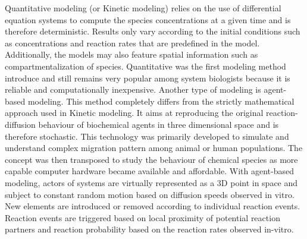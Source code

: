 Quantitative modeling (or Kinetic modeling) relies on the use of differential equation systems to compute the species concentrations at a given time and is therefore deterministic.
Results only vary according to the initial conditions such as concentrations and reaction rates that are predefined in the model.
Additionally, the models may also feature spatial information such as compartmentalization of species.
Quantitative was the first modeling method introduce and still remains very popular among system biologists because it is reliable and computationally inexpensive.
Another type of modeling is agent-based modeling.
This method completely differs from the strictly mathematical approach used in Kinetic modeling.
It aims at reproducing the original reaction-diffusion behaviour of biochemical agents in three dimensional space and is therefore stochastic.
This technology was primarily developed to simulate and understand complex migration pattern among animal or human populations.
The concept was then transposed to study the behaviour of chemical species as more capable computer hardware became available and affordable.
With agent-based modeling, actors of systems are virtually represented as a 3D point in space and subject to constant random motion based on diffusion speeds observed in vitro.
New elements are introduced or removed according to individual reaction events.
Reaction events are triggered based on local proximity of potential reaction partners and reaction probability based on the reaction rates observed in-vitro.

